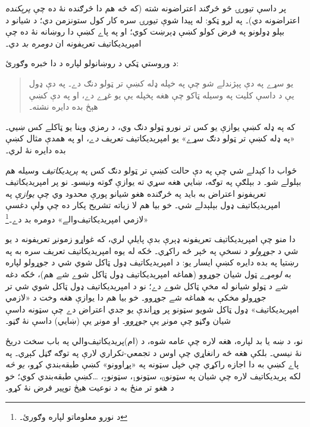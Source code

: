 \documentclass[../../../include/open-logic-section]{subfiles}
\begin{document}
پر داسې تيورۍ څو څرګند اعتراضونه شته (که څه هم دا څرګنده
نۀ ده چې \emph{پرېکنده} اعتراضونه دي)۔ په لږو ټکو: له پيدا
شوې تيورۍ سره کار کول ستونزمن دي؛ د شيانو د بېلو ډولونو په
فرض کولو کښې ډېرښت کوي؛ او په پاے کښې دا روښانه نۀ ده چې
امپريديکاتيف تعريفونه ان \emph{دومره بد} دي۔

د وروستي ټکي د روښانولو لپاره د \citeauthor{Ramsey1925}
دا خبره وګورئ:
\begin{quote}
  يو سړے په دې پېژندلے شو چې په خپله ډله کښې تر ټولو
  دنګ دے۔ په دې ډول يې د داسې کليت په وسيله ټاکو چې هغه
  پخپله يې يو غړے دے، او په دې کښې هېڅ بده دايره نشته۔
  \citep[p.~368]{Ramsey1925}
\end{quote}
که په ډله کښې يوازې يو کس تر نورو ټولو دنګ وي، د رمزي
وينا يو ټاکلے کس ښيي۔ «په ډله کښې تر ټولو دنګ سړے» يو
امپريديکاتيف تعريف \emph{دے}، او په همدې مثال کښې بده
دايره نۀ لري۔

ځواب دا کېدلے شي چې په دې حالت کښې تر ټولو دنګ کس په
\emph{پريديکاتيف} وسيله هم بېلولے شو۔ د بېلګې په توګه، ښايي
هغه سړي ته يوازې ګوته ونيسو۔ نو پر امپريديکاتيف تعريفونو
اعتراض به بايد په څرګنده هغو شيانو پورې محدود وي چې
\emph{يوازې} په امپريديکاتيف ډول بېلېدلے شي۔ خو بيا هم لا
زياته تشريح پکار ده چې ولې دغسې «لازمي امپريديکاتيف‌والے»
دومره بد دے۔\footnote{د نورو معلوماتو لپاره \citet{Linnebo2010} وګورئ۔}

دا منو چې امپريديکاتيف تعريفونه ډېرې بدې پايلې لري، که غواړو
زمونږ تعريفونه د يو شي د \emph{جوړولو} د نسخې په څېر څه
راکړي۔ ځکه له يوه امپريديکاتيف تعريف سره به په رښتيا په بده
دايره کښې ايسار يو: د امپريديکاتيف ډول ټاکل شوي شي د جوړولو
لپاره به \emph{لومړے} ټول شيان جوړوو (هماغه امپريديکاتيف ډول
ټاکل شوے شے هم)، ځکه دغه شے د ټولو شيانو له مخې ټاکل شوے
دے؛ نو د امپريديکاتيف ډول ټاکل شوي شي تر جوړولو مخکې به
هماغه شے جوړوو۔ خو بيا هم دا يوازې هغه وخت د «لازمي
امپريديکاتيف» ډول ټاکل شويو سټونو پر وړاندې يو جدي اعتراض
دے چې سټونه داسې شيان وګڼو چې مونږ يې \emph{جوړوو}۔ او
مونږ يې (ښايي) داسې نۀ ګڼو۔

نو، د ښه يا بد لپاره، هغه لاره چې عامه شوه، د
(ام)پريديکاتيف‌والي په باب سخت دريځ نۀ نيسي۔ بلکې هغه څه
رانغاړي چې اوس د تجمعي-تکراري لارې په توګه ګڼل کېږي۔ په
پاے کښې به دا اجازه راکړي چې خپل سټونه په «پړاوونو» کښې
طبقه‌بندي کړو، \emph{يو څه} لکه پريديکاتيف لاره چې شيان په
سټونو$_0$، سټونو$_1$، سټونو$_2$، \ldots کښې طبقه‌بندي کوي؛
خو د هغو تر منځ به د نوعيت هيڅ توپير فرض نۀ کړو۔
\end{document}
